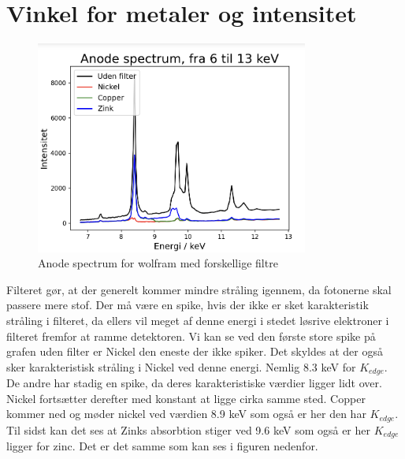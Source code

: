 \documentclass[a4paper,twoside]{article}
\begin{document}
\section{Vinkel for metaler og intensitet}
\begin{figure}[H]
\begin{centering}
\includegraphics[height=7cm]{Anode spectra.png}
\hspace{1cm}
\par\end{centering}
\caption{\label{cap:2ien} Anode spectrum for wolfram med forskellige filtre }
\end{figure}
Filteret gør, at der generelt kommer mindre stråling igennem, da  fotonerne skal passere mere stof. Der må være en spike, hvis der ikke er sket karakteristik stråling i filteret, da ellers vil meget af denne energi i stedet løsrive elektroner i filteret fremfor at ramme detektoren. Vi kan se ved den første store spike på grafen uden filter er Nickel den eneste der ikke spiker. Det skyldes at der også sker karakteristisk stråling i Nickel ved denne energi. Nemlig 8.3 keV for $K_{edge}$. De andre har stadig en spike, da deres karakteristiske værdier ligger lidt over. Nickel fortsætter derefter med konstant at ligge cirka samme sted. Copper kommer ned og møder nickel ved værdien 8.9 keV som også er her den har $K_{edge}$. Til sidst kan det ses at Zinks absorbtion stiger ved 9.6 keV som også er her $K_{edge}$ ligger for zinc. Det er det samme som kan ses i figuren nedenfor. 
\end{document}
